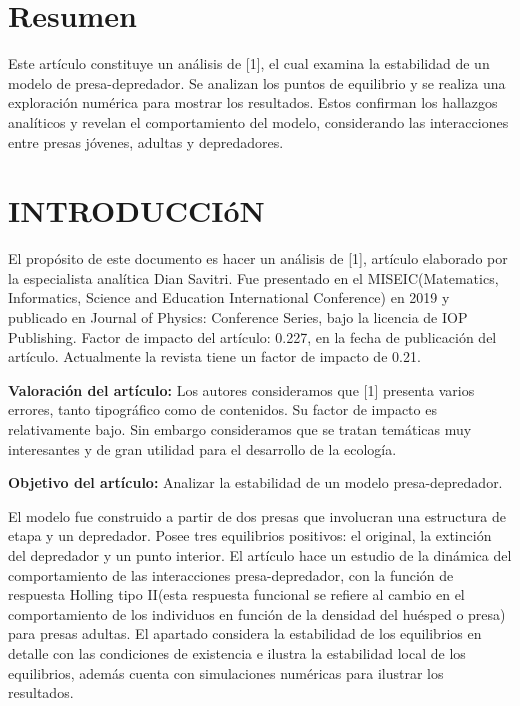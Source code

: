 \documentclass{wscpaperproc}
\theoremstyle{wsc}
\begin{document}
\maketitle

\section*{Resumen}
Este artículo constituye un análisis de [1], el cual examina la estabilidad de un modelo de presa-depredador.
Se analizan los puntos de equilibrio y se realiza una exploración numérica
para mostrar los resultados. Estos confirman los hallazgos analíticos
y revelan el comportamiento del modelo, considerando las interacciones entre presas
jóvenes, adultas y depredadores.
\section{INTRODUCCIóN}
\label{sec:intro}
El propósito de este documento es hacer un análisis de [1], artículo elaborado por la especialista analítica Dian Savitri. Fue presentado en el MISEIC(Matematics,
Informatics, Science and Education International Conference) en 2019 y publicado en Journal of Physics: Conference Series, bajo la licencia de IOP Publishing.
Factor de impacto del artículo: 0.227, en la fecha de publicación del artículo. Actualmente la revista tiene un factor de impacto de 0.21.

	{\bf Valoración del artículo:} Los autores consideramos que [1] presenta varios errores, tanto tipográfico como de contenidos. Su factor de impacto es
relativamente bajo. Sin embargo consideramos que se tratan temáticas muy interesantes y de gran utilidad para el desarrollo de la ecología.

{\bf Objetivo del artículo:} Analizar la estabilidad de un modelo presa-depredador.


El modelo fue construido a partir de dos presas que involucran una estructura de etapa y un depredador. Posee tres equilibrios positivos: el original, la extinción del
depredador y un punto interior. El artículo hace un estudio de la dinámica
del comportamiento de las interacciones presa-depredador, con la función de respuesta Holling tipo II(esta respuesta funcional se
refiere al cambio en el comportamiento de los individuos en función de la densidad del huésped o presa) para presas adultas. El apartado considera la estabilidad de
los equilibrios en detalle con las condiciones de existencia e ilustra la estabilidad local de los equilibrios, además cuenta con simulaciones numéricas para ilustrar
los resultados.
\end{document}
